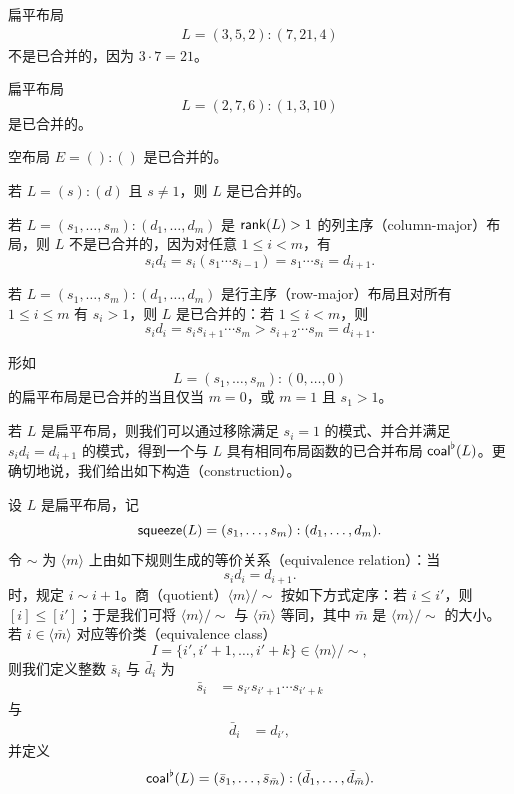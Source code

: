 \begin{example}
    扁平布局
    \begin{align*} L =(3,5,2):(7,21,4)
    \end{align*}
    不是已合并的，因为 $3\cdot 7 = 21$。
\end{example}
\begin{example}扁平布局
    \[
    L = (2,7,6):(1,3,10)
    \]
    是已合并的。
\end{example}
\begin{example}
    空布局 $E = ():()$ 是已合并的。
\end{example}
\begin{example}
    若 $L=(s):(d)$ 且 $s \neq 1$，则 $L$ 是已合并的。
\end{example}

\begin{example}
    若 $L = (s_1,\dots,s_m):(d_1,\dots,d_m)$ 是 $\mathsf{rank}(L)>1$ 的列主序（column-major）布局，则 $L$ 不是已合并的，因为对任意 $1 \leq i < m$，有
    \[
    s_id_i = s_i (s_1\cdots s_{i-1}) = s_1 \cdots s_i = d_{i+1}.
    \]
\end{example}

\begin{example}
    若 $L = (s_1,\dots,s_m):(d_1,\dots,d_m)$ 是行主序（row-major）布局且对所有 $1 \leq i \leq m$ 有 $s_i>1$，则 $L$ 是已合并的：若 $ 1\leq i < m$，则
    \[
    s_id_i = s_is_{i+1}\cdots s_m > s_{i+2}\cdots s_m = d_{i+1}.
    \]
\end{example}


\begin{example}
    形如
    \[L = (s_1,\dots,s_m):(0,\dots,0)\]
    的扁平布局是已合并的当且仅当 $m=0$，或 $m=1$ 且 $s_1>1$。
\end{example}

若 $L$ 是扁平布局，则我们可以通过移除满足 $s_i = 1$ 的模式、并合并满足 $s_id_i = d_{i+1}$ 的模式，得到一个与 $L$ 具有相同布局函数的已合并布局 $\mathsf{coal}^\flat(L)$。更确切地说，我们给出如下构造（construction）。

\begin{construction}\label{constructionofflatcoalesce}
设 $L$ 是扁平布局，记
\[\mathsf{squeeze}(L) = (s_1,\dots,s_m):(d_1,\dots,d_m).\]
令 $\sim$ 为 $\langle m \rangle$ 上由如下规则生成的等价关系（equivalence relation）：当
\[
s_id_i = d_{i+1}.
\]
时，规定 $i \sim i+1$。商（quotient）$\langle m \rangle / \sim$ 按如下方式定序：若 $i \leq i'$，则 $[i] \leq [i']$；于是我们可将 $\langle m \rangle / \sim$ 与 $\langle \bar{m} \rangle$ 等同，其中 $\bar{m}$ 是 $\langle m \rangle / \sim$ 的大小。若 $i \in \langle \bar{m} \rangle$ 对应等价类（equivalence class）
\[I = \{i', i' + 1, \dots, i'+k\} \in \langle m \rangle/\sim,\]
则我们定义整数 $\bar{s}_i$ 与 $\bar{d}_i$ 为
\begin{align*}
\bar{s}_i & = s_{i'} s_{i'+1}\cdots s_{i'+k}
\end{align*}
与
\begin{align*}
\bar{d}_i & = d_{i'},
\end{align*}
并定义
\[
\mathsf{coal}^\flat(L) = (\bar{s}_1,\dots,\bar{s}_{\bar{m}}):(\bar{d}_1,\dots,\bar{d}_{\bar{m}}).
\]
\end{construction}

